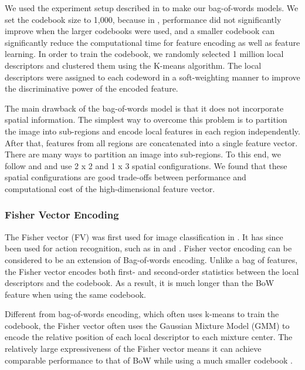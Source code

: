 We used the experiment setup described in \cite{jiang2010representations} to make our bag-of-words models. We set the codebook size to 1,000, because in \cite{jiang2010representations}, performance did not significantly improve when the larger codebooks were used, and a smaller codebook can significantly reduce the computational time for feature encoding as well as feature learning. In order to train the codebook, we randomly selected 1 million local descriptors and clustered them using the K-means algorithm. The local descriptors were assigned to each codeword in a soft-weighting manner \cite{Jiang:2007:TOB} to improve the discriminative power of the encoded feature.

The main drawback of the bag-of-words model is that it does not incorporate spatial information. The simplest way to overcome this problem is to partition the image into sub-regions and encode local features in each region independently. After that, features from all regions are concatenated into a single feature vector. There are many ways to partition an image into sub-regions. To this end, we follow \cite{jiang2010representations} and \cite{lazebnik2006beyond} and use 2 x 2 and 1 x 3 spatial configurations. We found that these spatial configurations are good trade-offs between performance and computational cost of the high-dimensional feature vector.

\subsubsection{Fisher Vector Encoding}
The Fisher vector (FV) was first used for image classification in \cite{jaakkola1999exploiting}. It has since been used for action recognition, such as in \cite{sun2013large} and \cite{wang2013action}. Fisher vector encoding can be considered to be an extension of Bag-of-words encoding. Unlike a bag of features, the Fisher vector encodes both first- and second-order statistics between the local descriptors and the codebook. As a result, it is much longer than the BoW feature when using the same codebook. 

  

Different from bag-of-words encoding, which often uses k-means to train the codebook, the Fisher vector often uses the Gaussian Mixture Model (GMM) to encode the relative position of each local descriptor to each mixture center. The relatively large expressiveness of the Fisher vector means it can achieve comparable performance to that of BoW while using a much smaller codebook \cite{sanchez2013image,sun2013large}.

